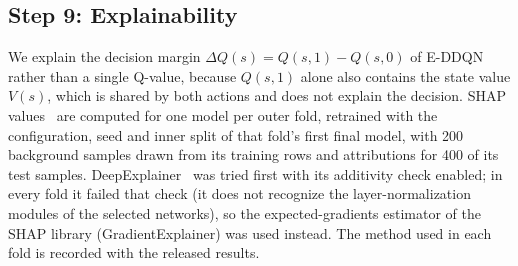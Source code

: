 \subsection{Step 9: Explainability}
\label{sec:shap}
We explain the decision margin $\Delta Q(s)=Q(s,1)-Q(s,0)$ of E-DDQN rather than a single Q-value, because $Q(s,1)$ alone also contains the state value $V(s)$, which is shared by both actions and does not explain the decision. SHAP values~\cite{lundberg2017shap} are computed for one model per outer fold, retrained with the configuration, seed and inner split of that fold's first final model, with 200 background samples drawn from its training rows and attributions for 400 of its test samples. DeepExplainer~\cite{shrikumar2017deeplift} was tried first with its additivity check enabled; in every fold it failed that check (it does not recognize the layer-normalization modules of the selected networks), so the expected-gradients estimator of the SHAP library (GradientExplainer) was used instead. The method used in each fold is recorded with the released results.
